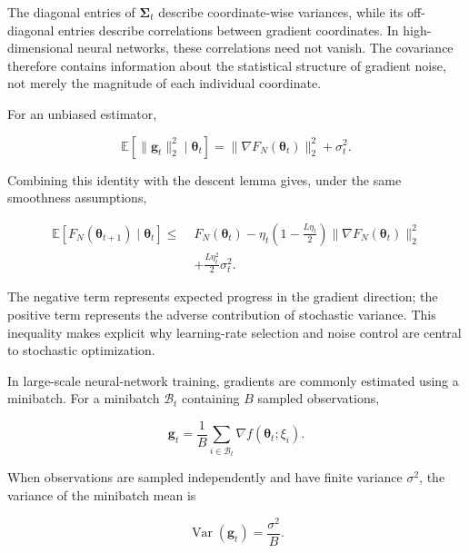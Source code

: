 The diagonal entries of $\boldsymbol{\Sigma}_t$ describe coordinate-wise
variances, while its off-diagonal entries describe correlations between
gradient coordinates. In high-dimensional neural networks, these
correlations need not vanish. The covariance therefore contains information
about the statistical structure of gradient noise, not merely the magnitude
of each individual coordinate.

For an unbiased estimator,

\begin{equation}
    \mathbb{E}
    [\|\mathbf{g}_t\|_2^2\mid\boldsymbol{\theta}_t]
    =
    \|\nabla F_N(\boldsymbol{\theta}_t)\|_2^2+\sigma_t^2.
    \label{eq:opt-second-moment-decomposition}
\end{equation}

Combining this identity with the descent lemma gives, under the same
smoothness assumptions,

\begin{align}
    \mathbb{E}
    [F_N(\boldsymbol{\theta}_{t+1})\mid\boldsymbol{\theta}_t]
    \leq\;&
    F_N(\boldsymbol{\theta}_t)
    -
    \eta_t\left(1-\frac{L\eta_t}{2}\right)
    \|\nabla F_N(\boldsymbol{\theta}_t)\|_2^2
    \nonumber\\
    &+
    \frac{L\eta_t^2}{2}\sigma_t^2.
    \label{eq:opt-stochastic-descent-bound}
\end{align}

The negative term represents expected progress in the gradient direction;
the positive term represents the adverse contribution of stochastic
variance. This inequality makes explicit why learning-rate selection and
noise control are central to stochastic optimization.

In large-scale neural-network training, gradients are commonly estimated
using a minibatch. For a minibatch $\mathcal{B}_t$ containing $B$ sampled
observations,

\begin{equation}
    \mathbf{g}_t
    =
    \frac{1}{B}
    \sum_{i\in\mathcal{B}_t}
    \nabla f(\boldsymbol{\theta}_t;\xi_i).
    \label{eq:opt-minibatch-gradient}
\end{equation}

When observations are sampled independently and have finite variance
$\sigma^2$, the variance of the minibatch mean is

\begin{equation}
    \operatorname{Var}(\mathbf{g}_t)
    =
    \frac{\sigma^2}{B}.
    \label{eq:opt-minibatch-variance}
\end{equation}

